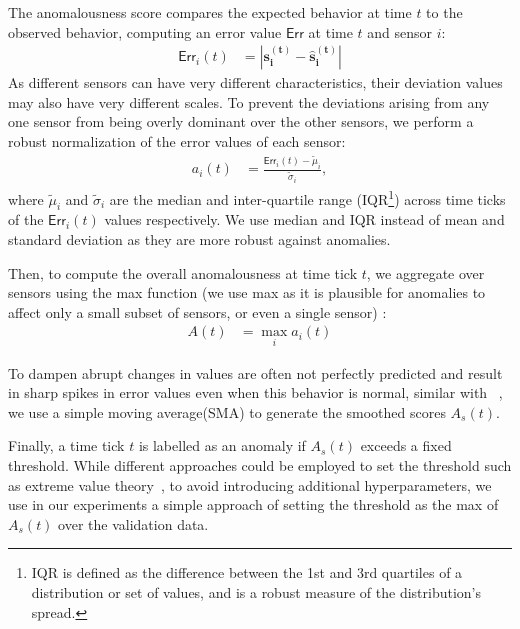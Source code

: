 \documentclass[letterpaper]{article} %
\begin{document}
The anomalousness score compares the expected behavior at time $t$ to the observed behavior, computing an error value $\mathsf{Err}$ at time $t$ and sensor $i$:
\begin{align}
    \mathsf{Err}_i\left(t\right) &= |\mathbf{s_i^{(t)}} - \mathbf{\hat{s}_i^{(t)}} |
\end{align}
As different sensors can have very different characteristics, their deviation values may also have very different scales. To prevent the deviations arising from any one sensor from being overly dominant over the other sensors, we perform a robust normalization of the error values of each sensor:
\begin{align}
    a_i\left(t\right) &= \frac{ \mathsf{Err}_i\left(t\right) - \widetilde\mu_i }{\widetilde\sigma_i},
\end{align}
where $\widetilde\mu_i$ and ${\widetilde\sigma_i}$ are the median and inter-quartile range (IQR\footnote{IQR is defined as the difference between the 1st and 3rd quartiles of a distribution or set of values, and is a robust measure of the distribution's spread.}) across time ticks of the $\mathsf{Err}_i\left(t\right)$ values respectively. We use median and IQR instead of mean and standard deviation as they are more robust against anomalies. 

Then, to compute the overall anomalousness at time tick $t$, we aggregate over sensors using the max function (we use max as it is plausible for anomalies to affect only a small subset of sensors, or even a single sensor) :
\begin{align}
    A\left(t\right) &= \max_{i}a_i\left(t\right)
\end{align}

To dampen abrupt changes in values are often not perfectly predicted and result in sharp spikes in error values even when this behavior is normal, similar with ~\cite{hundman2018detecting}, we use a simple moving average(SMA) to generate the smoothed scores $A_{s}\left(t\right)$.

Finally, a time tick $t$ is labelled as an anomaly if $A_{s}(t)$ exceeds a fixed threshold. While different approaches could be employed to set the threshold such as extreme value theory~\cite{siffer2017anomaly}, to avoid introducing additional hyperparameters, we use in our experiments a simple approach of setting the threshold as the max of $A_{s}(t)$ over the validation data. 

\end{document}
